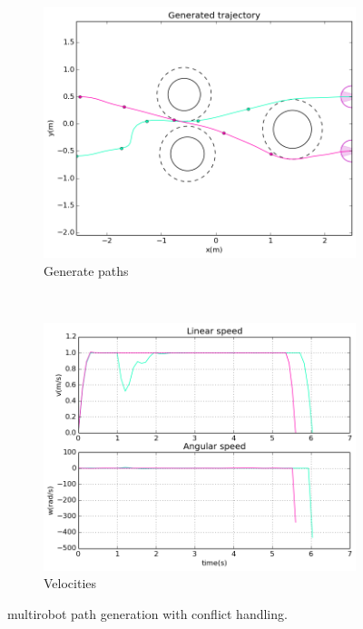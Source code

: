 \begin{figure}[!h]
        \centering
        ~ %
        \begin{subfigure}[b]{0.48\textwidth}
                \includegraphics[width=\textwidth]{./images/pnc.png}
                \caption{Generate paths}\label{fig:pnc}
        \end{subfigure}
        ~ %
        \begin{subfigure}[b]{0.48\textwidth}
                \includegraphics[width=\textwidth]{./images/vnc.png}
                \caption{Velocities}\label{fig:vnc}
        \end{subfigure}
        \caption{multirobot path generation with conflict handling.}\label{fig:nc}
\end{figure}

